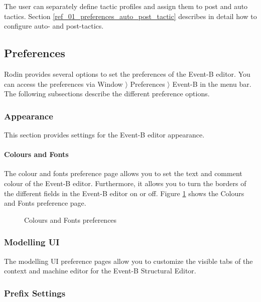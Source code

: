 The user can separately define tactic profiles and assign them to post and auto tactics.  Section \ref{ref_01_preferences_auto_post_tactic} describes in detail how to configure auto- and post-tactics. 

\subsection{Preferences}
\label{preferences}

Rodin provides several options to set the preferences of the Event-B editor. You can access the preferences via \textsf{Window $\rangle$ Preferences $\rangle$ Event-B} in the menu bar. The following subsections describe the different preference options.

\subsubsection{Appearance}

This section provides settings for the Event-B editor appearance.

\paragraph{Colours and Fonts}

The colour and fonts preference page allows you to set the text and comment colour of the Event-B editor. Furthermore, it allows you to turn  the borders of the different fields in the Event-B editor on or off. Figure \ref{fig_ref_01_preferences13} shows the Colours and Fonts preference page.

\begin{figure}[!ht]
\begin{center}
	\caption{Colours and Fonts preferences}
	\label{fig_ref_01_preferences13}
\end{center}
\end{figure}

\subsubsection{Modelling UI}

The modelling UI preference pages allow you to customize the visible tabs of the context and machine editor for the Event-B Structural Editor.

\subsubsection{Prefix Settings}

